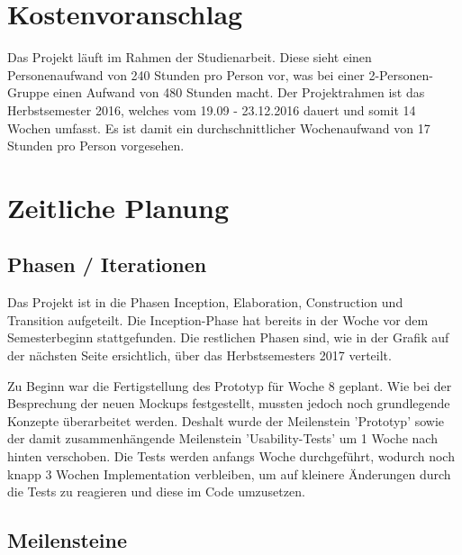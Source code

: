 
 \section{Kostenvoranschlag}
 Das Projekt läuft im Rahmen der Studienarbeit. Diese sieht einen Personenaufwand von 240 Stunden pro Person vor, was bei einer 2-Personen-Gruppe einen Aufwand von 480 Stunden macht. 
 Der Projektrahmen ist das Herbstsemester 2016, welches vom 19.09 - 23.12.2016 dauert und somit 14 Wochen umfasst. Es ist damit ein durchschnittlicher Wochenaufwand von 17 Stunden pro Person vorgesehen.
 
 
 \section{Zeitliche Planung}
 
 \subsection{Phasen / Iterationen}
 Das Projekt ist in die Phasen Inception, Elaboration, Construction und Transition aufgeteilt. Die Inception-Phase hat bereits in der Woche vor dem Semesterbeginn stattgefunden. Die restlichen Phasen sind, wie in der Grafik auf der nächsten Seite ersichtlich, über das Herbstsemesters 2017 verteilt.
 
 Zu Beginn war die Fertigstellung des Prototyp für Woche 8 geplant. Wie bei der Besprechung der neuen Mockups festgestellt, mussten jedoch noch grundlegende Konzepte überarbeitet werden. Deshalt wurde der Meilenstein 'Prototyp' sowie der damit zusammenhängende Meilenstein 'Usability-Tests' um 1 Woche nach hinten verschoben. Die Tests werden anfangs Woche durchgeführt, wodurch noch knapp 3 Wochen Implementation verbleiben, um auf kleinere Änderungen durch die Tests zu reagieren und diese im Code umzusetzen.
 
 
 
 
 
 \subsection{Meilensteine}
 
